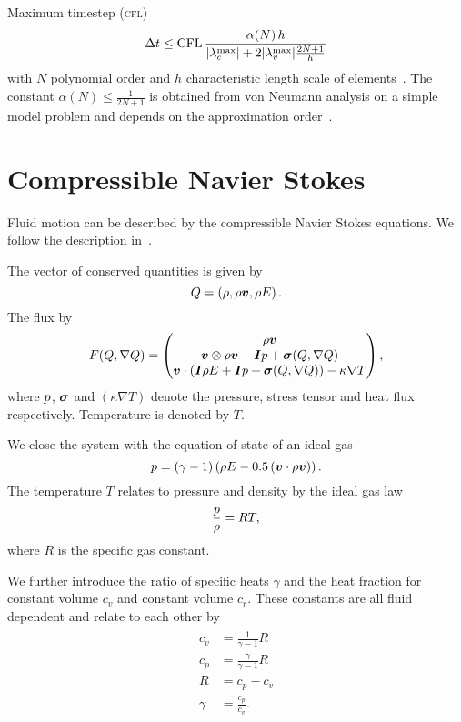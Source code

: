 Maximum timestep (\textsc{cfl})
\begin{equation}
 \Delta t \leq  \text{CFL} \, \frac{\alpha(N) \, h}{\vert \lambda_c^{\text{max}} \vert + 2 \vert \lambda_v^{\text{max}} \vert \frac{2N+1}{h}}
\end{equation}
with $N$ polynomial order and $h$ characteristic length scale of elements~\cite{dumbser2010arbitrary,gassner2008discontinuous}.
The constant $\alpha(N) \leq \frac{1}{2N+1}$ is obtained from von Neumann analysis on a simple model problem and depends on the approximation order~\cite{dumbser2008unified}.


\section{Compressible Navier Stokes}
Fluid motion can be described by the compressible Navier Stokes equations.
We follow the description in~\cite{dumbser2010arbitrary}.

The vector of conserved quantities is given by
\begin{equation}
  \label{eq:conserved-variables}
 Q = \left( \rho, \rho \bm{v}, \rho E \right).
\end{equation}
The flux by
\begin{equation}
  F(Q, \nabla Q) = 
  \begin{pmatrix}
    \rho \bm{v} \\
    \bm{v}  \otimes \rho \bm{v} + \bm{I} p + \bm{\sigma} (Q, \nabla Q)  \\
    \bm{v} \cdot (\bm{I} \rho E + \bm{I} p + \bm{\sigma} (Q, \nabla Q)) - \kappa \nabla T
  \end{pmatrix},
\end{equation}
where $p$, $\bm{\sigma}$ and $(\kappa \nabla T)$ denote the pressure, stress tensor and heat flux respectively.
Temperature is denoted by $T$.

We close the system with the equation of state of an ideal gas
\begin{equation}
  \label{eq:eos}
  p = (\gamma - 1) \left(\rho E - 0.5 \left(\bm{v} \cdot \rho \bm{v} \right) \right).
\end{equation}
The temperature $T$ relates to pressure and density by the ideal gas law
\begin{equation}
  \label{eq:temperature}
 \frac{p}{\rho} = RT,
\end{equation}
where $R$ is the specific gas constant.

We further introduce the ratio of specific heats $\gamma$ and the heat fraction for constant volume $c_v$ and constant volume $c_r$.
These constants are all fluid dependent and relate to each other by
\begin{align}
  \begin{split}
  c_v &= \frac{1}{\gamma - 1} R \\
  c_p &= \frac{\gamma}{\gamma - 1} R\\
  R &= c_p - c_v\\
  \gamma &= \frac{c_p}{c_v}.
  \end{split}
\end{align}

